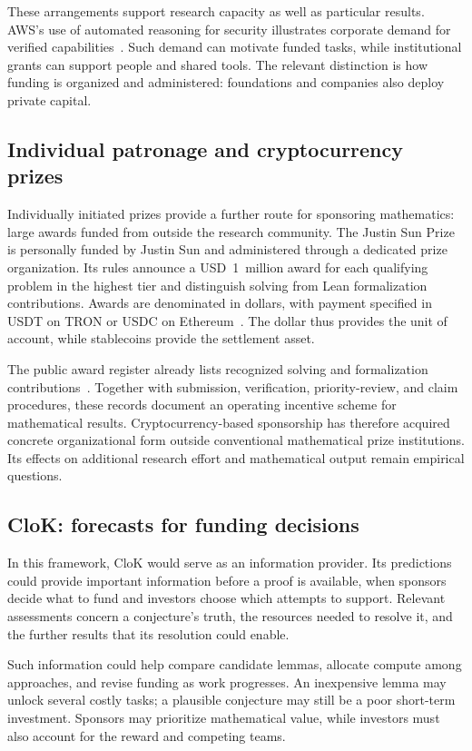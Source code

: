 \documentclass[11pt,a4paper,reqno]{amsart}
\numberwithin{equation}{section}
\begin{document}
These arrangements support research capacity as well as particular results. AWS's use of automated reasoning for security illustrates corporate demand for verified capabilities~\cite{aws}. Such demand can motivate funded tasks, while institutional grants can support people and shared tools. The relevant distinction is how funding is organized and administered: foundations and companies also deploy private capital.

\subsection{Individual patronage and cryptocurrency prizes}
Individually initiated prizes provide a further route for sponsoring mathematics: large awards funded from outside the research community. The Justin Sun Prize is personally funded by Justin Sun and administered through a dedicated prize organization. Its rules announce a USD~1~million award for each qualifying problem in the highest tier and distinguish solving from Lean formalization contributions. Awards are denominated in dollars, with payment specified in USDT on TRON or USDC on Ethereum~\cite{sunclaims,sun}. The dollar thus provides the unit of account, while stablecoins provide the settlement asset.

The public award register already lists recognized solving and formalization contributions~\cite{sunawards}. Together with submission, verification, priority-review, and claim procedures, these records document an operating incentive scheme for mathematical results. Cryptocurrency-based sponsorship has therefore acquired concrete organizational form outside conventional mathematical prize institutions. Its effects on additional research effort and mathematical output remain empirical questions.

\subsection{CloK: forecasts for funding decisions}
In this framework, CloK would serve as an information provider. Its predictions could provide important information before a proof is available, when sponsors decide what to fund and investors choose which attempts to support. Relevant assessments concern a conjecture's truth, the resources needed to resolve it, and the further results that its resolution could enable.

Such information could help compare candidate lemmas, allocate compute among approaches, and revise funding as work progresses. An inexpensive lemma may unlock several costly tasks; a plausible conjecture may still be a poor short-term investment. Sponsors may prioritize mathematical value, while investors must also account for the reward and competing teams.
\end{document}
